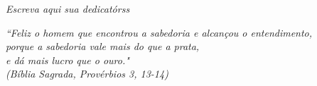\documentclass[
	12pt,				%
	oneside,
	a4paper,			%
	chapter=TITLE,
	english,			%
	brazil,				%
	]{abntex2}
\begin{document}

\frenchspacing 

\pretextual

\imprimircapa

\imprimirfolhaderosto



\begin{dedicatoria}
	\vspace*{\fill}
	\centering
	\noindent
	\textit{Escreva aqui sua dedicatórss}
	 \vspace*{\fill}
\end{dedicatoria}



\begin{epigrafe}
	\vspace*{\fill}
	\begin{flushright}
		\textit{``Feliz o homem que encontrou a sabedoria e alcançou o entendimento,\\
			porque a sabedoria vale mais do que a prata, \\
			e dá mais lucro que o ouro."\\
			(Bíblia Sagrada, Provérbios 3, 13-14)}
	\end{flushright}
\end{epigrafe}



\listoffigures*
\cleardoublepage

\listoftables*
\cleardoublepage
\end{document}
